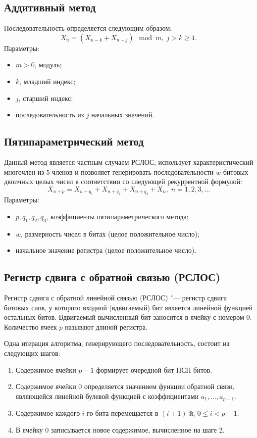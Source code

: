 \documentclass[bachelor, och, labwork]{SCWorks}
\begin{document}
\subsection{Аддитивный метод}
Последовательность определяется следующим образом:
\[ X_n = (X_{n - k} + X_{n - j}) \mod m, \; j > k \geq 1. \]
Параметры:
\begin{itemize}
  \item $m > 0$, модуль;
  \item $k$, младший индекс;
  \item $j$, старший индекс;
  \item последовательность из $j$ начальных значений.
\end{itemize}

\subsection{Пятипараметрический метод}
Данный метод является частным случаем РСЛОС, использует характеристический многочлен из 5 членов и позволяет генерировать последовательности $w$-битовых двоичных целых чисел в соответствии со следующей рекуррентной 
формулой:
\[ X_{n + p} = X_{n + q_1} + X_{n + q_2} + X_{n + q_3} + X_n, \; n = 1, 2, 3, \dots \]
Параметры:
\begin{itemize}
  \item $p, q_1, q_2, q_3$, коэффициенты пятипараметрического метода;
  \item $w$, размерность чисел в битах (целое положительное число);
  \item начальное значение регистра (целое положительное число).
\end{itemize}

\subsection{Регистр сдвига с обратной связью (РСЛОС)}
Регистр сдвига с обратной линейной связью (РСЛОС) "--- регистр сдвига битовых слов, у которого входной (вдвигаемый) бит является линейной функцией остальных битов. Вдвигаемый вычисленный бит заносится в 
ячейку с номером 0. Количество ячеек $p$ называют длиной регистра.

Одна итерация алгоритма, генерирующего последовательность, состоит 
из следующих шагов:
\begin{enumerate}
  \item Содержимое ячейки $p - 1$ формирует очередной бит ПСП битов.
  \item Содержимое ячейки 0 определяется значением функции обратной связи, 
  являющейся линейной булевой функцией с коэффициентами $a_1, \dots, a_{p - 1}$.
  \item Содержимое каждого $i$-го бита перемещается в $(i + 1)$-й, $0 \leq i < p - 1$. 
  \item В ячейку 0 записывается новое содержимое, вычисленное на шаге 2.
\end{enumerate}
\end{document}
